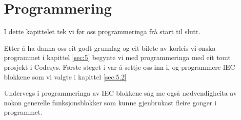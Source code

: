 \chapter{Programmering}
\thispagestyle{fancy}
I dette kapittelet tek vi før oss programmeringa frå start til slutt.

Etter å ha danna oss eit godt grunnlag og eit bilete av korleis vi ønska programmet i kapittel \ref{sec:5} 
begynte vi med programmeringa med eit tomt prosjekt i \gls{Codesys}. Første steget i var å 
settje oss inn i, og programmere \gls{IEC} blokkene som vi valgte i kapittel \ref{sec:5.2}

Undervegs i programmeringa av \gls{IEC} blokkene såg me også nødvendigheita av nokon generelle funksjonsblokker
som kunne gjenbrukast fleire gonger i programmet.



